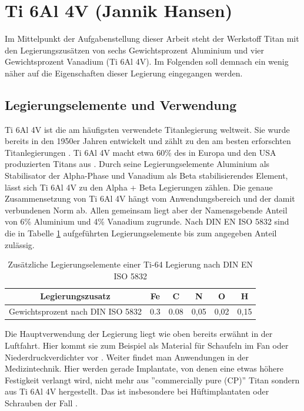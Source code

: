 \documentclass[a4paper, 11pt]{tubsreprt}
\begin{document}
\section{Ti 6Al 4V (Jannik Hansen)}\label{Kapitel ti64}
Im Mittelpunkt der Aufgabenstellung dieser Arbeit steht der Werkstoff Titan mit den Legierungszusätzen von sechs Gewichtsprozent Aluminium und vier Gewichtsprozent Vanadium (Ti 6Al 4V). Im Folgenden soll demnach ein wenig näher auf die Eigenschaften dieser Legierung eingegangen werden.  
\subsection{Legierungselemente und Verwendung}
Ti 6Al 4V ist die am häufigsten verwendete Titanlegierung weltweit. Sie wurde bereits in den 1950er Jahren entwickelt und zählt zu den am besten erforschten Titanlegierungen \cite{Leyens2002}. Ti 6Al 4V macht etwa 60\% des in Europa und den USA produzierten Titans aus \cite{Sieniawski2013}. Durch seine Legierungselemente Aluminium als Stabilisator der Alpha-Phase und Vanadium als Beta stabilisierendes Element, lässt sich Ti 6Al 4V zu den Alpha + Beta Legierungen zählen. Die genaue Zusammensetzung von Ti 6Al 4V hängt vom Anwendungsbereich und der damit verbundenen Norm ab. Allen gemeinsam liegt aber der Namensgebende Anteil von 6\% Aluminium und 4\% Vanadium zugrunde. Nach DIN EN ISO 5832 sind die in Tabelle \ref{Tabelle Norm Legierungselemente Ti64} aufgeführten Legierungselemente bis zum angegeben Anteil zulässig.

\begin{table}[t]
\begin{tabular}{c|c|c|c|c|c}
Legierungszusatz & Fe & C & N & O & H \\
\hline
Gewichtsprozent nach DIN ISO 5832 & 0.3 & 0.08 & 0,05 & 0,02 & 0,15 \\
\end{tabular}
\caption{Zusätzliche Legierungselemente einer Ti-64 Legierung nach DIN EN ISO 5832}
\label{Tabelle Norm Legierungselemente Ti64}
\end{table}

Die Hauptverwendung der Legierung liegt wie oben bereits erwähnt in der Luftfahrt. Hier kommt sie zum Beispiel als Material für Schaufeln im Fan oder Niederdruckverdichter vor \cite{Luetjering2007}. Weiter findet man Anwendungen in der Medizintechnik. Hier werden gerade Implantate, von denen eine etwas höhere Festigkeit verlangt wird, nicht mehr aus ''commercially pure (CP)'' Titan sondern aus Ti 6Al 4V hergestellt. Das ist insbesondere bei Hüftimplantaten oder Schrauben der Fall \cite{Luetjering2007}.
\newpage
\end{document}

